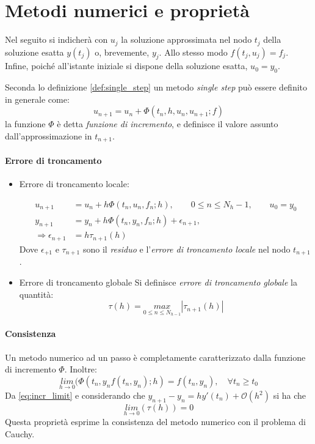 \section{Metodi numerici e proprietà}

Nel seguito si indicherà con $u_j$ la soluzione approssimata nel nodo $t_j$ della soluzione esatta $y(t_j)$ o, brevemente, $y_j$. \newline
Allo stesso modo $f(t_j, u_j) = f_j$. Infine, poiché all'istante iniziale si dispone della soluzione esatta, $u_0 = y_0$.

Seconda lo definizione \ref{def:single_step} un metodo \textit{single step} può essere definito in generale come:
\begin{equation}\label{eq:Single_Step}
    u_{n+1} = u_n + \Phi(t_n , h, u_n , u_{n+1} ; f)
\end{equation}
la funzione $\Phi$ è detta \emph{funzione di incremento}, e definisce il valore assunto dall'approssimazione in $t_{n+1}$.
\paragraph{Errore di troncamento}
\begin{itemize}
\item Errore di troncamento locale: \newline

\begin{align} \label{eq:local_trunc_err} \nonumber
u_{n+1} &= u_n + h\Phi(t_n, u_n,f_n;h), \qquad 0\leq n \leq N_h - 1 , \qquad u_0 = y_0 \\
\nonumber y_{n+1} &= y_n + h\Phi(t_n, y_n,f_n;h) +\epsilon_{n+1} , \\ \Rightarrow
\epsilon_{n+1} &= h \tau_{n+1}(h) 
\end{align}
Dove $\epsilon_{+1}$ e $\tau_{n+1}$ sono il \emph{residuo} e l'\emph{errore di troncamento locale} nel nodo $t_{n+1}$.
\item Errore di troncamento globale \newline 
Si definisce \emph{errore di troncamento globale}  la quantità:
\begin{equation} \label{eq:glob_trunc_err}
\tau(h) = \underset{0 \leq n \leq N_{h-1}}{max} \left|\tau_{n+1}(h) \right|
\end{equation}
\end{itemize}
\paragraph{Consistenza}
Un metodo numerico ad un passo è completamente caratterizzato dalla funzione di incremento $\Phi$. Inoltre: 
\begin{equation} \label{eq:incr_limit}
\underset{h\rightarrow 0}{lim} (\Phi(t_n,y_nf(t_n,y_n);h)=f(t_n, y_n),\quad \forall t_n \geq t_0
\end{equation}
Da \ref{eq:incr_limit} e considerando che $y_{n+1}-y_n = hy'(t_n) + \mathcal{O}(h^2)$ si ha che
\begin{equation} \label{eq:consistenza}
\underset{h\rightarrow 0}{lim }(\tau(h)) = 0
\end{equation}
Questa proprietà esprime la consistenza del metodo numerico con il problema di Cauchy.

